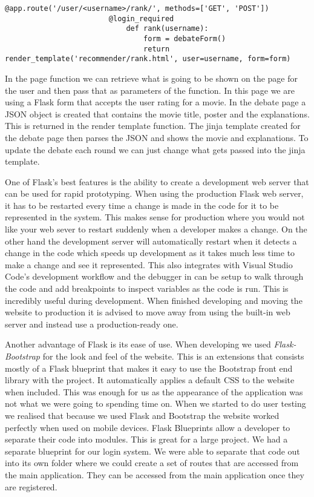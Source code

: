                     \begin{lstlisting}[gobble=20, tabsize=4,  caption=Code to create page, label=fig:CodeToCreatePage]
                        @app.route('/user/<username>/rank/', methods=['GET', 'POST'])
                        @login_required
                            def rank(username):
                                form = debateForm()
                                return render_template('recommender/rank.html', user=username, form=form)
                    \end{lstlisting}

                    In the page function we can retrieve what is going to be shown on the page for the user and then pass that as parameters of the function. In this page we are using a Flask form that accepts the user rating for a movie. In the debate page a JSON object is created that contains the movie title, poster and the explanations. This is returned in the render template function. The jinja template created for the debate page then parses the JSON and shows the movie and explanations. To update the debate each round we can just change what gets passed into the jinja template. 

                    
                    One of Flask's best features is the ability to create a development web server that can be used for rapid prototyping. When using the production Flask web server, it has to be restarted every time a change is made in the code for it to be represented in the system. This makes sense for production where you would not like your web sever to restart suddenly when a developer makes a change. On the other hand the development server will automatically restart when it detects a change in the code which speeds up development as it takes much less time to make a change and see it represented. This also integrates with Visual Studio Code's development workflow and the debugger in can be setup to walk through the code and add breakpoints to inspect variables as the code is run. This is incredibly useful during development. When finished developing and moving the website to production it is advised to move away from using the built-in web server and instead use a production-ready one.

                    Another advantage of Flask is its ease of use. When developing we used \textit{Flask-Bootstrap} for the look and feel of the website. This is an extensions that consists mostly of a Flask blueprint that makes it easy to use the Bootstrap front end library with the project. It automatically applies a default CSS to the website when included. This was enough for us as the appearance of the application was not what we were going to spending time on. When we started to do user testing we realised that because we used Flask and Bootstrap the website worked perfectly when used on mobile devices. Flask Blueprints allow a developer to separate their code into modules. This is great for a large project. We had a separate blueprint for our login system. We were able to separate that code out into its own folder where we could create a set of routes that are accessed from the main application. They can be accessed from the main application once they are registered. 
                    
